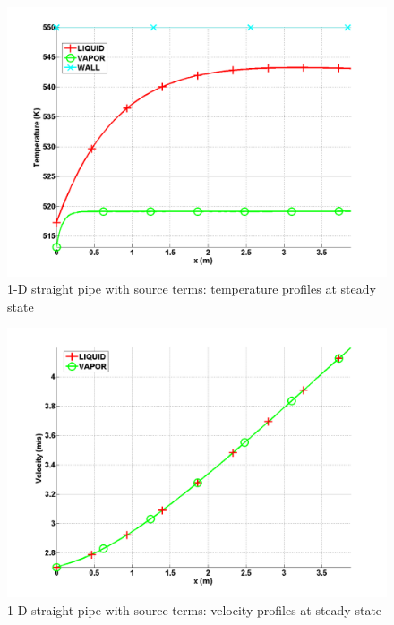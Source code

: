 %
        \begin{figure}[H]
                \centering
                \includegraphics[width=\textwidth]{figures/SEM/ANS_WINTER_2014_7Eqn_temperature.png}
                \caption{1-D straight pipe with source terms: temperature profiles at steady state}
                \label{fig:temperature}
        \end{figure}%
%            
        \begin{figure}[H]
                \centering
                \includegraphics[width=\textwidth]{figures/SEM/ANS_WINTER_2014_7Eqn_velocity.png}
                \caption{1-D straight pipe with source terms: velocity profiles at steady state}
                \label{fig:velocity}
        \end{figure}
%
